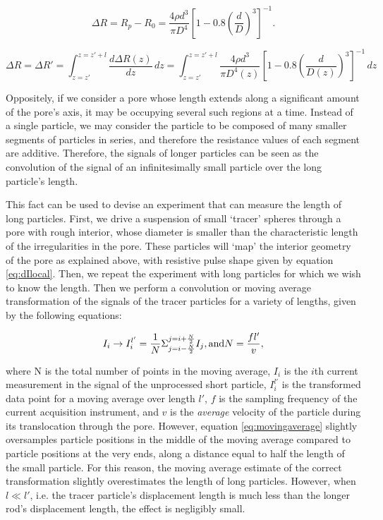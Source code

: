 		\begin{equation}\label{eq:dIlocal}
			\Delta R=R_{p}-R_{0}=\frac{4\rho d^{3}}{\pi D^{4}}\left[1-0.8\left(\frac{d}{D}\right)^{3}\right]^{-1}.
		\end{equation}

		
		\begin{equation}\label{eq:theoreticalmovingaverage}
			\Delta R=\Delta R'=\int_{z=z'}^{z=z'+l}\frac{d\Delta R\left(z\right)}{dz}\,dz=\int_{z=z'}^{z=z'+l}\frac{4\rho d^{3}}{\pi D^{4}\left(z\right)}\left[1-0.8\left(\frac{d}{D\left(z\right)}\right)^{3}\right]^{-1}\,dz
		\end{equation}

		
		Oppositely, if we consider a pore whose length extends along a significant amount of the pore's axis, it may be occupying several such regions at a time. Instead of a single particle, we may consider the particle to be composed of many smaller segments of particles in series, and therefore the resistance values of each segment are additive. Therefore, the signals of longer particles can be seen as the convolution of the signal of an infinitesimally small particle over the long particle's length. 
		
		This fact can be used to devise an experiment that can measure the length of long particles. First, we drive a suspension of small `tracer' spheres through a pore with rough interior, whose diameter is smaller than the characteristic length of the irregularities in the pore. These particles will `map' the interior geometry of the pore as explained above, with resistive pulse shape given by equation \ref{eq:dIlocal}. Then, we repeat the experiment with long particles for which we wish to know the length. Then we perform a convolution or moving average transformation of the signals of the tracer particles for a variety of lengths, given by the following equations:
		
		\begin{equation}\label{eq:movingaverage}
			I_{i}\rightarrow I_{i}^{l'}=\frac{1}{N}\Sigma_{j=i-\frac{N}{2}}^{j=i+\frac{N}{2}}I_{j}, \mathrm{and} \\
			N=\frac{fl'}{v},
		\end{equation}
		
		where N is the total number of points in the moving average, $I_{i}$ is the $i$th current measurement in the signal of the unprocessed short particle, $I_{i}^{l'}$ is the transformed data point for a moving average over length $l'$, $f$ is the sampling frequency of the current acquisition instrument, and $v$ is the \textit{average} velocity of the particle during its translocation through the pore. However, equation \ref{eq:movingaverage} slightly oversamples particle positions in the middle of the moving average compared to particle positions at the very ends, along a distance equal to half the length of the small particle. For this reason, the moving average estimate of the correct transformation slightly overestimates the length of long particles. However, when $l\ll l'$, i.e. the tracer particle's displacement length is much less than the longer rod's displacement length, the effect is negligibly small. 

